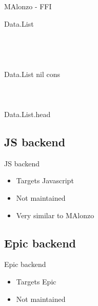 \begin{frame}[fragile]{MAlonzo - FFI}
\begin{code}%
\>\AgdaSymbol{\{-\#}  Data.List \AgdaSymbol{\#-\}}\<%
\\
%
\\
\>  \AgdaSymbol{:} \AgdaSymbol{(} \AgdaSymbol{:} \AgdaSymbol{)} \AgdaSymbol{->}  \<%
\\
\>[0]\<[2]%
\>[2] \AgdaSymbol{:}  \AgdaSymbol{\{}\AgdaSymbol{\}}   \<%
\\
\>[0]\<[2]%
\>[2] \AgdaSymbol{:}  \AgdaSymbol{\{}\AgdaSymbol{\}}        \<%
\\
\>\AgdaSymbol{\{-\#}   Data.List nil cons \AgdaSymbol{\#-\}}\<%
\\
%
\\
\>\<%
\\
\>[0]\<[2]%
\>[2] \AgdaSymbol{:}  \AgdaSymbol{\{}\AgdaSymbol{\}}    \AgdaSymbol{->} \<%
\\
\>\AgdaSymbol{\{-\#}   Data.List.head \AgdaSymbol{\#-\}}\<%
\\
\>\<%
\end{code}
\end{frame}



\subsection{JS backend}
\begin{frame}{JS backend}
\begin{itemize}
\item Targets Javascript
\item Not maintained
\item Very similar to MAlonzo
\end{itemize}
\end{frame}

\subsection{Epic backend}
\begin{frame}{Epic backend}
\begin{itemize}
\item Targets Epic
\item Not maintained
\end{itemize}
\end{frame}

